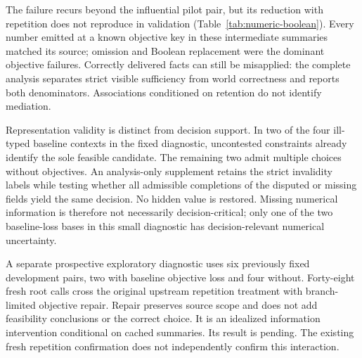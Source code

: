 The failure recurs beyond the influential pilot pair, but its reduction with repetition does not reproduce in validation (Table~\ref{tab:numeric-boolean}). Every number emitted at a known objective key in these intermediate summaries matched its source; omission and Boolean replacement were the dominant objective failures. Correctly delivered facts can still be misapplied: the complete analysis separates strict visible sufficiency from world correctness and reports both denominators. Associations conditioned on retention do not identify mediation.

Representation validity is distinct from decision support. In two of the four ill-typed baseline contexts in the fixed diagnostic, uncontested constraints already identify the sole feasible candidate. The remaining two admit multiple choices without objectives. An analysis-only supplement retains the strict invalidity labels while testing whether all admissible completions of the disputed or missing fields yield the same decision. No hidden value is restored. Missing numerical information is therefore not necessarily decision-critical; only one of the two baseline-loss bases in this small diagnostic has decision-relevant numerical uncertainty.

A separate prospective exploratory diagnostic uses six previously fixed development pairs, two with baseline objective loss and four without. Forty-eight fresh root calls cross the original upstream repetition treatment with branch-limited objective repair. Repair preserves source scope and does not add feasibility conclusions or the correct choice. It is an idealized information intervention conditional on cached summaries. Its result is pending. The existing fresh repetition confirmation does not independently confirm this interaction.
